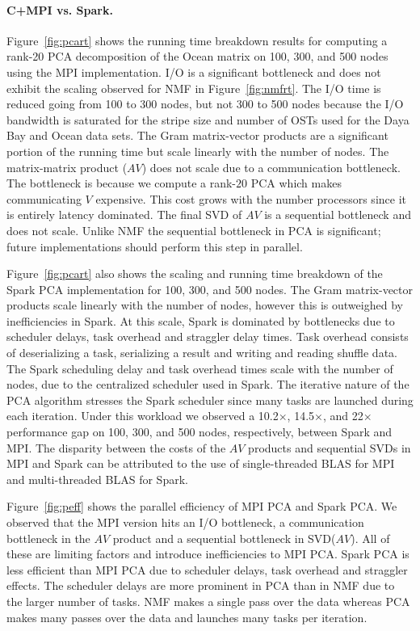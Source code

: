 \paragraph{C+MPI vs. Spark.}
Figure~\ref{fig:pcart} shows the running time breakdown results for computing a rank-20 PCA decomposition of the Ocean matrix on 100, 300, and 500 nodes using the MPI implementation. I/O is a significant bottleneck and does not exhibit the scaling observed for NMF in Figure~\ref{fig:nmfrt}. The I/O time is reduced going from 100 to 300 nodes, but not 300 to 500 nodes because the I/O bandwidth is saturated for the stripe size and number of OSTs used for the Daya Bay and Ocean data sets. The Gram matrix-vector products are a significant portion of the running time but scale linearly with the number of nodes. The matrix-matrix product ($AV$) does not scale due to a communication bottleneck. The bottleneck is because we compute a rank-$20$ PCA which makes communicating $V$ expensive. This cost grows with the number processors since it is entirely latency dominated. The final SVD of $AV$ is a sequential bottleneck and does not scale. Unlike NMF the sequential bottleneck in PCA is significant; future implementations should perform this step in parallel.

Figure~\ref{fig:pcart} also shows the scaling and running time breakdown of the Spark PCA implementation for 100, 300, and 500 nodes. The Gram matrix-vector products scale linearly with the number of nodes, however this is outweighed by inefficiencies in Spark. At this scale, Spark is dominated by bottlenecks due to scheduler delays, task overhead and straggler delay times. Task overhead consists of deserializing a task, serializing a result and writing and reading shuffle data. The Spark scheduling delay and task overhead times scale with the number of nodes, due to the centralized scheduler used in Spark. The iterative nature of the PCA algorithm stresses the Spark scheduler since many tasks are launched during each iteration. Under this workload we observed a 10.2$\times$, 14.5$\times$, and 22$\times$ performance gap on 100, 300, and 500 nodes, respectively, between Spark and MPI. The disparity between the costs of the $AV$ products and sequential SVDs in MPI and Spark can be attributed to the use of single-threaded BLAS for MPI and multi-threaded BLAS for Spark.

Figure~\ref{fig:peff} shows the parallel efficiency of MPI PCA and Spark PCA. We observed that the MPI version hits an I/O bottleneck, a communication bottleneck in the $AV$ product and a sequential bottleneck in SVD($AV$). All of these are limiting factors and introduce inefficiencies to MPI PCA. Spark PCA is less efficient than MPI PCA due to scheduler delays, task overhead and straggler effects. The scheduler delays are more prominent in PCA than in NMF due to the larger number of tasks. NMF makes a single pass over the data whereas PCA makes many passes over the data and launches many tasks per iteration.

